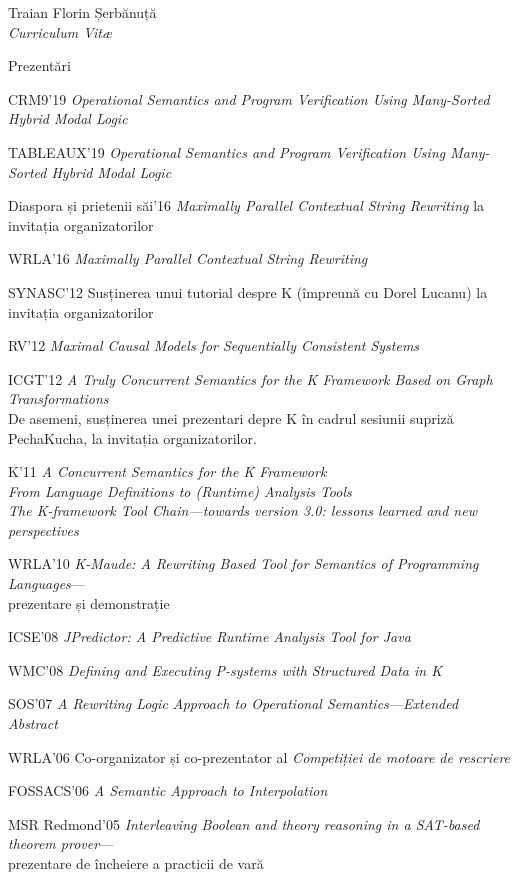 \documentclass[10pt, romanian]{article}
\begin{document}
\begin{cv}{Traian Florin Șerbănuță\\{\large \itshape Curriculum Vit\ae}}
\setlength{\cvlabelwidth}{\oldcvlabelwidth}

\begin{cvlist}{Prezentări}
\item[CRM9'19] \textit{Operational Semantics and Program Verification Using Many-Sorted Hybrid 
               Modal Logic}
\item[TABLEAUX'19] \textit{Operational Semantics and Program Verification Using Many-Sorted Hybrid
               Modal Logic}
\item[Diaspora și prietenii săi'16] \textit{Maximally Parallel Contextual String Rewriting} la invitația organizatorilor
\item[WRLA'16] \textit{Maximally Parallel Contextual String Rewriting}
\item[SYNASC'12] Susținerea unui tutorial despre K (împreună cu Dorel Lucanu) la invitația organizatorilor
\item[RV'12]  \textit{Maximal Causal Models for Sequentially Consistent Systems}
\item[ICGT'12] \textit{A Truly Concurrent Semantics for the K Framework Based on
               Graph Transformations}
               \\
               De asemeni, susținerea unei prezentari depre K în cadrul sesiunii supriză PechaKucha, la invitația organizatorilor.
\item[K'11] \textit{A Concurrent Semantics for the K Framework}
\\ \textit{From Language Definitions to (Runtime) Analysis Tools}
\\ \textit{The K-framework Tool Chain---towards version 3.0: lessons learned and new perspectives}
\item[WRLA'10] \textit{K-Maude: A Rewriting Based Tool for Semantics of Programming Languages}---\\prezentare și demonstrație
\item[ICSE'08] \textit{JPredictor: A Predictive Runtime Analysis Tool for Java}
\item[WMC'08] \textit{Defining and Executing P-systems with Structured Data in K}
\item[SOS'07] \textit{A Rewriting Logic Approach to Operational Semantics---Extended Abstract}
\item[WRLA'06] Co-organizator și co-prezentator al \textit{Competiției de motoare de rescriere}
\item[FOSSACS'06] \textit{A Semantic Approach to Interpolation}
\item[MSR Redmond'05] \textit{Interleaving Boolean and theory reasoning in a SAT-based theorem prover}---\\prezentare de încheiere a practicii de vară
\end{cvlist}


\end{cv}
\end{document}

